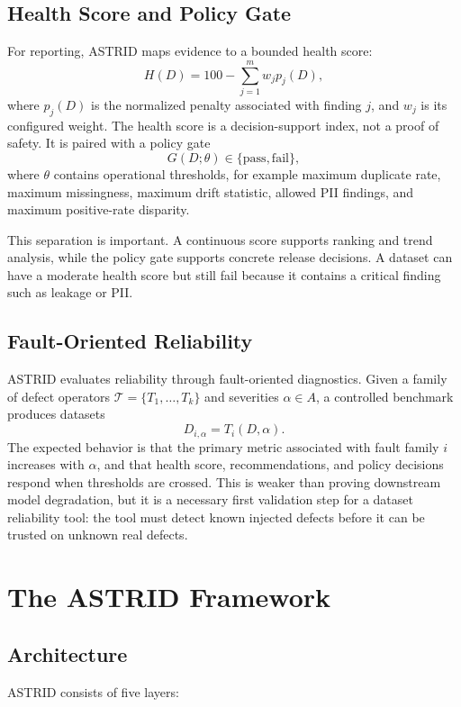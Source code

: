 \documentclass[runningheads]{llncs}
\begin{document}
\subsection{Health Score and Policy Gate}

For reporting, ASTRID maps evidence to a bounded health score:
\[
H(D) = 100 - \sum_{j=1}^{m} w_j p_j(D),
\]
where $p_j(D)$ is the normalized penalty associated with finding $j$, and $w_j$
is its configured weight. The health score is a decision-support index, not a
proof of safety. It is paired with a policy gate
\[
G(D; \theta) \in \{\mathrm{pass}, \mathrm{fail}\},
\]
where $\theta$ contains operational thresholds, for example maximum duplicate
rate, maximum missingness, maximum drift statistic, allowed PII findings, and
maximum positive-rate disparity.

This separation is important. A continuous score supports ranking and trend
analysis, while the policy gate supports concrete release decisions. A dataset
can have a moderate health score but still fail because it contains a critical
finding such as leakage or PII.

\subsection{Fault-Oriented Reliability}

ASTRID evaluates reliability through fault-oriented diagnostics. Given a family
of defect operators $\mathcal{T} = \{T_1,\ldots,T_k\}$ and severities
$\alpha \in A$, a controlled benchmark produces datasets
\[
D_{i,\alpha} = T_i(D, \alpha).
\]
The expected behavior is that the primary metric associated with fault family
$i$ increases with $\alpha$, and that health score, recommendations, and policy
decisions respond when thresholds are crossed. This is weaker than proving
downstream model degradation, but it is a necessary first validation step for a
dataset reliability tool: the tool must detect known injected defects before it
can be trusted on unknown real defects.

\section{The ASTRID Framework}

\subsection{Architecture}

ASTRID consists of five layers:
\end{document}
